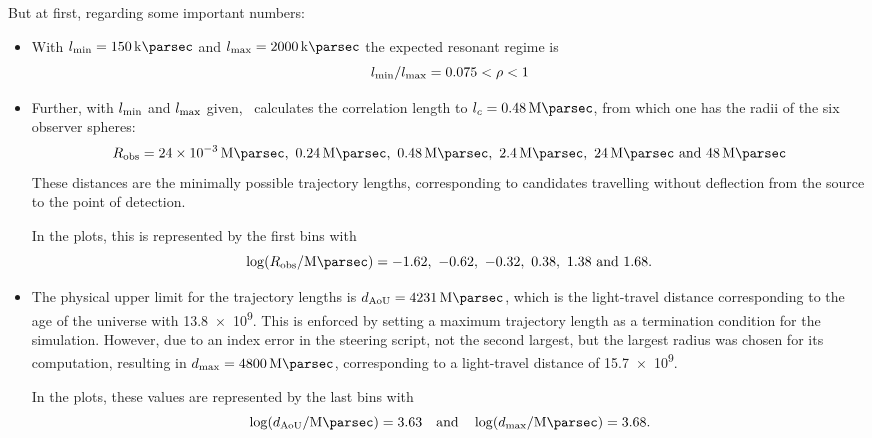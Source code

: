But at first, regarding some important numbers:
\begin{itemize}
    \item With $\lmin=\SI{150}{\kilo\parsec}$ and
        $\lmax=\SI{2000}{\kilo\parsec}$ the expected resonant regime is
        \[l_{\mathrm{min}}/l_{\mathrm{max}}=0.075<\rho<1\]

    \item Further, with $l_{\mathrm{min}}$ and $l_{\mathrm{max}}$ given, \CRPropa~calculates the
        correlation length to $l_c=\SI{.48}{\mega\parsec}$, from which one has
        the radii of the six observer spheres:
        \[\Robserver=\SIlist{24e-3;0.24;0.48;2.4;24;48}{\mega\parsec}\]
        These distances are the minimally possible trajectory lengths,
        corresponding to candidates travelling without deflection from the
        source to the point of detection.

        In the plots, this is represented by the first bins with
        \[\log(\Robserver/\si{\mega\parsec})=
            \numlist{-1.62;-0.62;-0.32;0.38;1.38;1.68}.\]

    \item The physical upper limit for the trajectory lengths is
        $\dAoU=\SI{4231}{\mega\parsec}$, which is the light-travel
        distance corresponding to the age of the universe with
        \SI{13.8e9}{\jahr}. This is enforced by setting a maximum trajectory
        length as a termination condition for the simulation.
        However, due to an index error in the steering script, not the second
        largest, but the largest radius was chosen for its computation,
        resulting in $\dmax=\SI{4800}{\mega\parsec}$, corresponding to a
        light-travel distance of \SI{15.7e9}{\jahr}.

        In the plots, these values are represented by the last bins with
        \[\log(\dAoU/\si{\mega\parsec})=3.63
            \qq{and}\log(\dmax/\si{\mega\parsec})=3.68.\]
\end{itemize}

